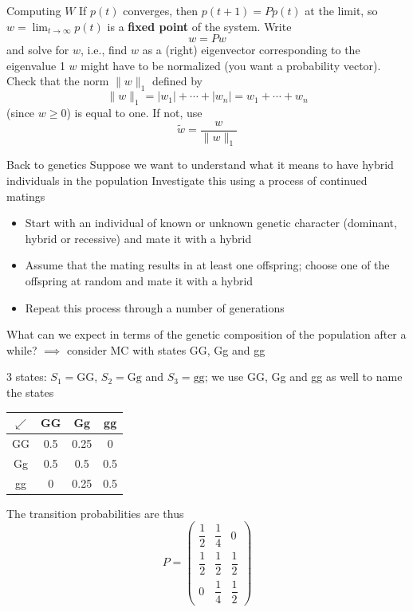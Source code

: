 \documentclass[aspectratio=169]{beamer}\usepackage[]{graphicx}\usepackage[]{xcolor}
\begin{document}
\begin{frame}{Computing $W$}
If $p(t)$ converges, then $p(t+1)=Pp(t)$ at the limit, so $w=\lim_{t\to\infty}p(t)$ is a \textbf{fixed point} of the system. Write
\[
w=Pw
\]
and solve for $w$, i.e., find $w$ as a (right) eigenvector corresponding to the eigenvalue 1
\vfill
$w$ might have to be normalized (you want a probability vector). Check that the norm $\|w\|_1$ defined by
\[
\|w\|_1=|w_1|+\cdots+|w_n|=w_1+\cdots+w_n
\]
(since $w\geq 0$) is equal to one. If not, use
\[
\tilde w = \frac{w}{\|w\|_1}
\]
\end{frame}


\begin{frame}{Back to genetics}
Suppose we want to understand what it means to have hybrid individuals in the population
\vfill
Investigate this using a process of continued matings
\begin{itemize}
\item Start with an individual of known or unknown
genetic character (dominant, hybrid or recessive) and mate it with a hybrid
\item Assume that the mating results in at least one
offspring; choose one of the offspring at random and mate it with a hybrid
\item Repeat this process through a number of generations
\end{itemize}
\vfill
What can we expect in terms of the genetic composition of the population after a while? 
\vfill
$\implies$ consider MC with states GG, Gg and gg
\end{frame}


\begin{frame}
3 states: $S_1=\textrm{GG}$, $S_2=\textrm{Gg}$ and $S_3=\textrm{gg}$; we use GG, Gg and gg as well to name the states
\vfill
\begin{center}
\begin{tabular}{c|ccc}
$\swarrow$ & GG & Gg & gg \\
\hline
GG & 0.5 & 0.25 & 0 \\
Gg & 0.5 & 0.5 & 0.5 \\
gg & 0 & 0.25 & 0.5
\end{tabular}
\end{center}
\vfill
The transition probabilities are thus
\[
P=\begin{pmatrix}
\dfrac 12 & \dfrac 14 & 0 \\[10pt]
\dfrac 12 & \dfrac 12 & \dfrac 12 \\[10pt]
0 & \dfrac 14 & \dfrac 12
\end{pmatrix}
\]
\end{frame}
\end{document}
